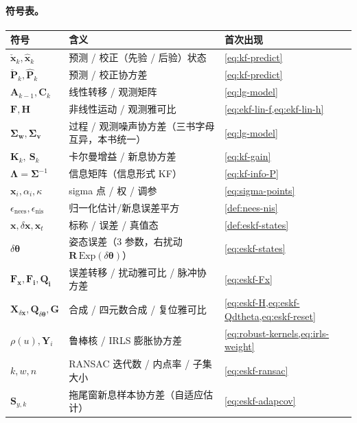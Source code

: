 \paragraph{符号表。}
\begin{table}[ht]\centering\small
\begin{tabular}{lll}
\toprule
符号 & 含义 & 首次出现 \\
\midrule
$\check{\mathbf{x}}_k,\hat{\mathbf{x}}_k$ & 预测 / 校正（先验 / 后验）状态 & \cref{eq:kf-predict} \\
$\check{\mathbf{P}}_k,\hat{\mathbf{P}}_k$ & 预测 / 校正协方差 & \cref{eq:kf-predict} \\
$\mathbf{A}_{k-1},\mathbf{C}_k$ & 线性转移 / 观测矩阵 & \cref{eq:lg-model} \\
$\mathbf{F},\mathbf{H}$ & 非线性运动 / 观测雅可比 & \cref{eq:ekf-lin-f,eq:ekf-lin-h} \\
$\boldsymbol{\Sigma}_{\mathbf{w}},\boldsymbol{\Sigma}_{\mathbf{v}}$ & 过程 / 观测噪声协方差（三书字母互异，本书统一） & \cref{eq:lg-model} \\
$\mathbf{K}_k,\ \mathbf{S}_k$ & 卡尔曼增益 / 新息协方差 & \cref{eq:kf-gain} \\
$\boldsymbol{\Lambda}=\boldsymbol{\Sigma}^{-1}$ & 信息矩阵（信息形式 KF） & \cref{eq:kf-info-P} \\
$\mathbf{x}_i,\alpha_i,\kappa$ & sigma 点 / 权 / 调参 & \cref{eq:sigma-points} \\
$\epsilon_{\text{nees}},\epsilon_{\text{nis}}$ & 归一化估计/新息误差平方 & \cref{def:nees-nis} \\
$\mathbf{x},\delta\mathbf{x},\mathbf{x}_t$ & 标称 / 误差 / 真值态 & \cref{def:eskf-states} \\
$\delta\boldsymbol{\theta}$ & 姿态误差（$3$ 参数，右扰动 $\mathbf{R}\,\mathrm{Exp}(\delta\boldsymbol{\theta})$） & \cref{eq:eskf-states} \\
$\mathbf{F}_{\mathbf{x}},\mathbf{F}_{\mathbf{i}},\mathbf{Q}_{\mathbf{i}}$ & 误差转移 / 扰动雅可比 / 脉冲协方差 & \cref{eq:eskf-Fx} \\
$\mathbf{X}_{\delta\mathbf{x}},\mathbf{Q}_{\delta\boldsymbol{\theta}},\mathbf{G}$ & 合成 / 四元数合成 / 复位雅可比 & \cref{eq:eskf-H,eq:eskf-Qdtheta,eq:eskf-reset} \\
$\rho(u),\mathbf{Y}_i$ & 鲁棒核 / IRLS 膨胀协方差 & \cref{eq:robust-kernels,eq:irls-weight} \\
$k,w,n$ & RANSAC 迭代数 / 内点率 / 子集大小 & \cref{eq:eskf-ransac} \\
$\mathbf{S}_{y,k}$ & 拖尾窗新息样本协方差（自适应估计） & \cref{eq:eskf-adapcov} \\
\bottomrule
\end{tabular}
\end{table}

